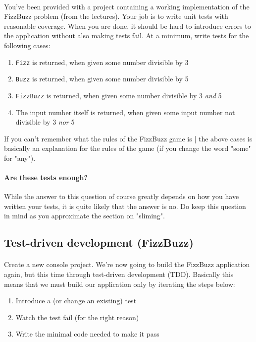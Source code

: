\documentclass{article}
\begin{document}
    \paragraph{}
      You've been provided with a project containing a working implementation of the FizzBuzz problem (from the lectures). Your job is to write unit tests with reasonable coverage. When you are done, it should be hard to introduce errors to the application without also making tests fail. At a minimum, write tests for the following cases:
      \begin{enumerate}
        \item \texttt{Fizz} is returned, when given some number divisible by 3
        \item \texttt{Buzz} is returned, when given some number divisible by 5
        \item \texttt{FizzBuzz} is returned, when given some number divisible by 3 \emph{and} 5
        \item The input number itself is returned, when given some input number not divisible by 3 \emph{nor} 5
      \end{enumerate}
     If you can't remember what the rules of the FizzBuzz game is | the above cases is basically an explanation for the rules of the game (if you change the word "some" for "any").
    \paragraph{Are these tests enough?}
      While the answer to this question of course greatly depends on how you have written your tests, it is quite likely that the answer is no. Do keep this question in mind as you approximate the section on "sliming".

  \subsection{ Test-driven development (FizzBuzz) }
    \paragraph{}
      Create a new console project. We're now going to build the FizzBuzz application again, but this time through test-driven development (TDD). Basically this means that we must build our application only by iterating the steps below:
      \begin{enumerate}
        \item Introduce a (or change an existing) test
        \item Watch the test fail (for the right reason)
        \item Write the minimal code needed to make it pass
      \end{enumerate}
\end{document}
